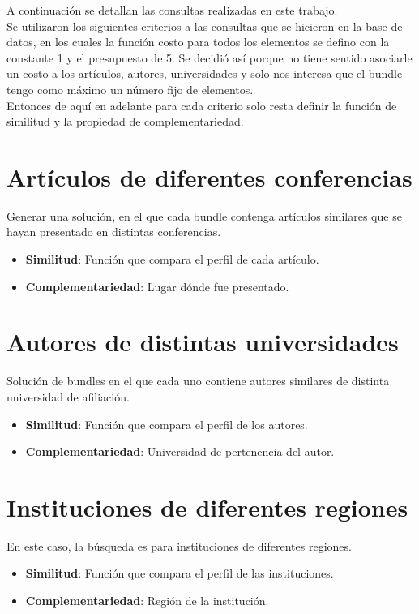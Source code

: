 A continuación se detallan las consultas realizadas en este trabajo.\\
Se utilizaron los siguientes criterios a las consultas que se hicieron en la base de datos, en los cuales la función costo para todos los elementos se defino con la constante 1 y el presupuesto de 5. Se decidió así porque no tiene sentido asociarle un costo a los artículos, autores, universidades y solo nos interesa que el bundle tengo como máximo un número fijo de elementos. \\
Entonces de aquí en adelante para cada criterio solo resta definir la función de similitud y la propiedad de complementariedad.

\section{Artículos de diferentes conferencias}\label{bus:papSimDisLug}
Generar una solución, en el que cada bundle contenga artículos similares que se hayan presentado en distintas conferencias.\\
\begin{itemize}
  \item \textbf{Similitud}: Función que compara el perfil de cada artículo.
  \item \textbf{Complementariedad}: Lugar dónde fue presentado.
\end{itemize}

\section{Autores de distintas universidades}
Solución de bundles en el que cada uno contiene autores similares de distinta universidad de afiliación.\\
\begin{itemize}
  \item \textbf{Similitud}: Función que compara el perfil de los autores.
  \item \textbf{Complementariedad}: Universidad de pertenencia del autor.
\end{itemize}

\section{Instituciones de diferentes regiones}
En este caso, la búsqueda es para instituciones de diferentes regiones. 
\begin{itemize}
  \item \textbf{Similitud}: Función que compara el perfil de las instituciones.
  \item \textbf{Complementariedad}: Región de la institución.
\end{itemize}

